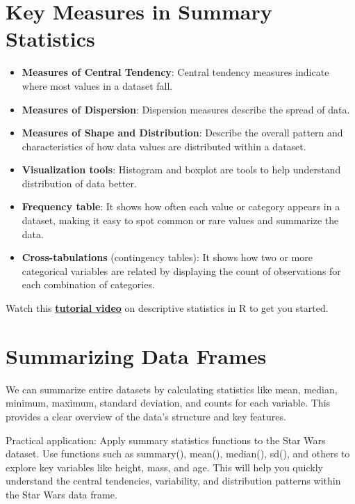 \documentclass[
  man,
  floatsintext,
  longtable,
  nolmodern,
  notxfonts,
  notimes,
  colorlinks=true,linkcolor=blue,citecolor=blue,urlcolor=blue]{apa7}
\providecommand{\tightlist}{%
  \setlength{\itemsep}{0pt}\setlength{\parskip}{0pt}}
\begin{document}
\newpage

\section{Key Measures in Summary
Statistics}\label{key-measures-in-summary-statistics}

\begin{itemize}
\tightlist
\item
  \textbf{Measures of Central Tendency}: Central tendency measures
  indicate where most values in a dataset fall.
\item
  \textbf{Measures of Dispersion}: Dispersion measures describe the
  spread of data.
\item
  \textbf{Measures of Shape and Distribution}: Describe the overall
  pattern and characteristics of how data values are distributed within
  a dataset.
\item
  \textbf{Visualization tools}: Histogram and boxplot are tools to help
  understand distribution of data better.
\item
  \textbf{Frequency table}: It shows how often each value or category
  appears in a dataset, making it easy to spot common or rare values and
  summarize the data.
\item
  \textbf{Cross-tabulations} (contingency tables): It shows how two or
  more categorical variables are related by displaying the count of
  observations for each combination of categories.
\end{itemize}

Watch this
\href{https://www.youtube.com/watch?v=yoPGwvUzjgQ}{\textbf{tutorial
video}} on descriptive statistics in R to get you started.

\vspace{1cm}

\section{Summarizing Data Frames}\label{summarizing-data-frames}

We can summarize entire datasets by calculating statistics like mean,
median, minimum, maximum, standard deviation, and counts for each
variable. This provides a clear overview of the data's structure and key
features.

Practical application: Apply summary statistics functions to the Star
Wars dataset. Use functions such as summary(), mean(), median(), sd(),
and others to explore key variables like height, mass, and age. This
will help you quickly understand the central tendencies, variability,
and distribution patterns within the Star Wars data frame.
\end{document}
